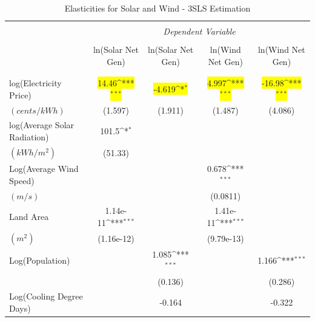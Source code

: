 \documentclass[11pt,aspectratio=169]{beamer}
\def\sym#1{\ifmmode^{#1}\else\(^{#1}\)\fi}
\begin{document}
\begin{frame}

\fontsize{6pt}{7}\selectfont
\begin{center}
	\begin{table}
		\caption{Elasticities for Solar and Wind - 3SLS Estimation} 
		\begin{tabular}{l*{4}{c}}
			\\[-7ex]\hline  
			\hline \\[-1.2ex]  
			& \multicolumn{4}{c}{\textit{\scriptsize Dependent Variable}} \\ [0.25em] 
			\cline{2-5}  \\[-.5em] 
			& ln(Solar Net Gen) & ln(Solar Net Gen) & ln(Wind Net Gen) & ln(Wind Net Gen) \\ \\ [-0.7em]
			\hline \\[-1.5ex] 
			log(Electricity Price)       &       \colorbox{yellow}{14.46\sym{***}}&     \colorbox{yellow}{ -4.619\sym{*}}  &       \colorbox{yellow}{4.997\sym{***}}&      \colorbox{yellow}{-16.98\sym{***}}\\
			$(cents/kWh)$&     (1.597)         &     (1.911)         &     (1.487)         &     (4.086)         \\
			[0.5em]
			log(Average Solar Radiation)     &       101.5\sym{*}  &                     &                       &                     \\
			$(kWh/m^2)$&     (51.33)         &                     &                     &                     \\
			[0.5em]
			Log(Average Wind Speed)&                     &                     &       0.678\sym{***}&                     \\
			$(m/s)$&                     &                     &    (0.0811)         &                     \\
			[0.5em]
			Land Area    &    1.14e-11\sym{***}&                     &    1.41e-11\sym{***}&                     \\
			$(m^2)$&  (1.16e-12)         &                     &  (9.79e-13)         &                     \\
			[0.5em]
			Log(Population)      &                     &       1.085\sym{***}&                     &       1.166\sym{***}\\
			&                     &     (0.136)         &                     &     (0.286)         \\
			[0.5em]
			Log(Cooling Degree Days)      &                     &      -0.164         &                     &      -0.322         \\

\end{tabular}
\end{table}
\end{center}
\end{frame}
\end{document}
